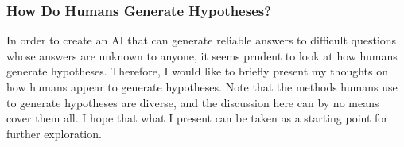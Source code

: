 






\subsubsection{How Do Humans Generate Hypotheses?}

In order to create an AI that can generate reliable answers to difficult questions whose answers are unknown to anyone, it seems prudent to look at how humans generate hypotheses. Therefore, I would like to briefly present my thoughts on how humans appear to generate hypotheses. 
Note that the methods humans use to generate hypotheses are diverse, and the discussion here can by no means cover them all. I hope that what I present can be taken as a starting point for further exploration.

